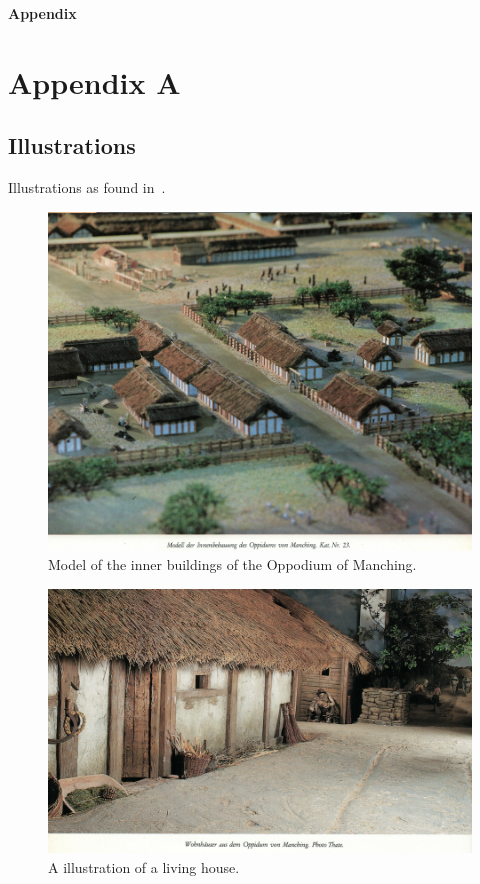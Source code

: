 \begin{center}
	\bigskip \bigskip \bigskip \bigskip
	{\huge \bf Appendix} \\
	\bigskip \bigskip
\end{center}

\section{Appendix A}

\subsection{Illustrations}
\label{appendix:illustrations}

Illustrations as found in~\cite{kraemer-oppidum-maching}.

\begin{figure}[ht]
	\centering
	\includegraphics[width=\linewidth]{pictures/scan_manching_2.png}
	\caption{Model of the inner buildings of the  Oppodium of Manching.}
\end{figure}

\begin{figure}[ht]
	\centering
	\includegraphics[width=\linewidth]{pictures/scan_manching_1.png}
	\caption{A illustration of a living house.}
\end{figure}

